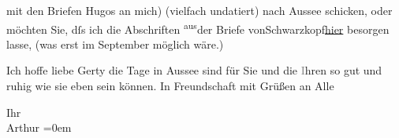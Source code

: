                mit den Briefen Hugos an mich) {\pb}(vielfach undatiert) nach Aussee schicken, oder möchten Sie, dſs \introOben{}ich\introOben{} die
               Abschriften \substVorne{}\textsuperscript{aus}\substDazwischen{}der Briefe von\substHinten{}{ }Schwarzkopf\uline{hier} besorgen lasse, (was erst im
                  September möglich wäre.)\pend
           
\pstart
           Ich hoffe liebe Gerty die Tage in Aussee sind für
               Sie und die \textcolor{gray}{I}hren so gut und ruhig wie sie eben sein können. In
               Freundschaft mit Grüßen an Alle\pend
           
\pstart
           Ihr{\\[\baselineskip]}\spacefill\mbox{Arthur}\pend
           \leftskip=0em{}\endnumbering{}  \newcommand{\dateiname}{L02516}\newcommand{\titel}{Arthur Schnitzler an Gerty Hofmannsthal, 2. 8. 1929}\newcommand{\editorInnen}{Martin Anton Müller und Gerd-Hermann Susen}
